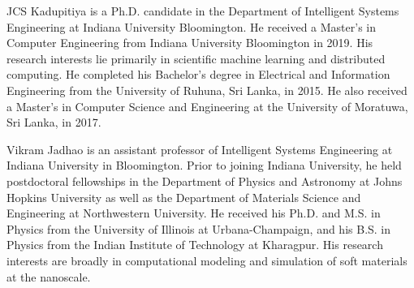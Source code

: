 \documentclass[compsoc]{IEEEtran}
\begin{document}
\begin{IEEEbiography}
{JCS Kadupitiya} is a Ph.D. candidate in the Department of Intelligent Systems Engineering at Indiana University Bloomington. He received a Master's in Computer Engineering from Indiana University Bloomington in 2019.  His research interests lie primarily in scientific machine learning and distributed computing. He completed his Bachelor’s degree in Electrical and Information Engineering from the University of Ruhuna, Sri Lanka, in 2015. He also received a Master's in Computer Science and Engineering at the University of Moratuwa, Sri Lanka, in 2017.
\end{IEEEbiography}


\begin{IEEEbiography}
 {Vikram Jadhao} is an assistant professor of Intelligent Systems Engineering at Indiana University in Bloomington. Prior to joining Indiana University, he held postdoctoral fellowships in the Department of Physics and Astronomy at Johns Hopkins University as well as the Department of Materials Science and Engineering at Northwestern University. He received his Ph.D. and M.S. in Physics from the University of Illinois at Urbana-Champaign, and his B.S. in Physics from the Indian Institute of Technology at Kharagpur. His research interests are broadly in computational modeling and simulation of soft materials at the nanoscale. 
\end{IEEEbiography}
\end{document}
